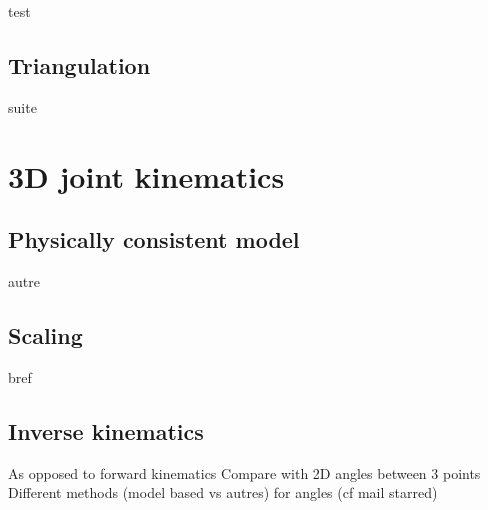 test


\subsection{Triangulation}

suite


\section{3D joint kinematics}

\subsection{Physically consistent model}

autre


\subsection{Scaling}

bref


\subsection{Inverse kinematics}

As opposed to forward kinematics \newline
Compare with 2D angles between 3 points \newline
Different methods (model based vs autres) for angles (cf mail starred)\newline




